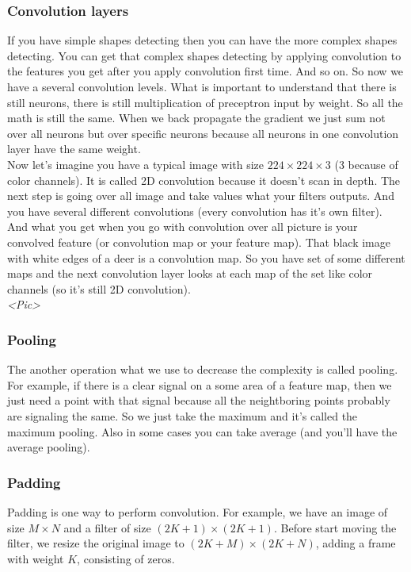 \subsubsection*{Convolution layers}

If you have simple shapes detecting then you can have the more complex shapes detecting. You can get that complex shapes detecting by applying convolution to the features you get after you apply convolution first time. And so on. So now we have a several convolution levels. What is important to understand that there is still neurons, there is still multiplication of preceptron input by weight. So all the math is still the same. When we back propagate the gradient we just sum not over all neurons but over specific neurons because all neurons in one convolution layer have the same weight.\\
Now let's imagine you have a typical image with size $224\times224\times3$ (3 because of color channels). It is called 2D convolution because it doesn't scan in depth. The next step is going over all image and take values what your filters outputs. And you have several different convolutions (every convolution has it's own filter). And what you get when you go with convolution over all picture is your convolved feature (or convolution map or your feature map). That black image with white edges of a deer is a convolution map. So you have set of some different maps and the next convolution layer looks at each map of the set like color channels (so it's still 2D convolution).\\
{\it <Pic>}

\subsubsection*{Pooling}

The another operation what we use to decrease the complexity is called pooling. For example, if there is a clear signal on a some area of a feature map, then we just need a point with that signal because all the neightboring points probably are signaling the same. So we just take the maximum and it's called the maximum pooling. Also in some cases you can take average (and you'll have the average pooling).

\subsubsection*{Padding}

Padding is one way to perform convolution. For example, we have an image of size $M\times N$ and a filter of size $(2K+1)\times(2K+1)$. Before start moving the filter, we resize the original image to $(2K+M)\times(2K+N)$, adding a frame with weight $K$, consisting of zeros.

